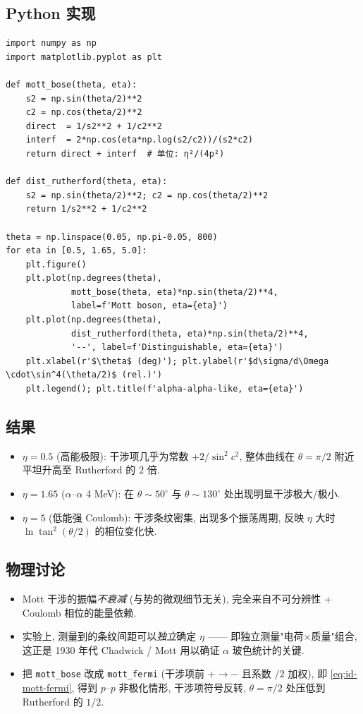 \subsection*{Python 实现}
\begin{lstlisting}
import numpy as np
import matplotlib.pyplot as plt

def mott_bose(theta, eta):
    s2 = np.sin(theta/2)**2
    c2 = np.cos(theta/2)**2
    direct  = 1/s2**2 + 1/c2**2
    interf  = 2*np.cos(eta*np.log(s2/c2))/(s2*c2)
    return direct + interf  # 单位: η²/(4p²)

def dist_rutherford(theta, eta):
    s2 = np.sin(theta/2)**2; c2 = np.cos(theta/2)**2
    return 1/s2**2 + 1/c2**2

theta = np.linspace(0.05, np.pi-0.05, 800)
for eta in [0.5, 1.65, 5.0]:
    plt.figure()
    plt.plot(np.degrees(theta),
             mott_bose(theta, eta)*np.sin(theta/2)**4,
             label=f'Mott boson, eta={eta}')
    plt.plot(np.degrees(theta),
             dist_rutherford(theta, eta)*np.sin(theta/2)**4,
             '--', label=f'Distinguishable, eta={eta}')
    plt.xlabel(r'$\theta$ (deg)'); plt.ylabel(r'$d\sigma/d\Omega \cdot\sin^4(\theta/2)$ (rel.)')
    plt.legend(); plt.title(f'alpha-alpha-like, eta={eta}')
\end{lstlisting}

\subsection*{结果}
\begin{itemize}
  \item $\eta=0.5$ (高能极限): 干涉项几乎为常数 $+2/\sin^2 c^2$, 整体曲线在 $\theta=\pi/2$ 附近平坦升高至 Rutherford 的 $2$ 倍.
  \item $\eta=1.65$ ($\alpha$--$\alpha$ 4 MeV): 在 $\theta\sim 50^\circ$ 与 $\theta\sim 130^\circ$ 处出现明显干涉极大/极小.
  \item $\eta=5$ (低能强 Coulomb): 干涉条纹密集, 出现多个振荡周期, 反映 $\eta$ 大时 $\ln\tan^2(\theta/2)$ 的相位变化快.
\end{itemize}

\subsection*{物理讨论}
\begin{itemize}
  \item Mott 干涉的振幅\emph{不衰减} (与势的微观细节无关), 完全来自不可分辨性 + Coulomb 相位的能量依赖.
  \item 实验上, 测量到的条纹间距可以\emph{独立}确定 $\eta$ —— 即独立测量"电荷$\times$质量"组合, 这正是 1930 年代 Chadwick / Mott 用以确证 $\alpha$ 玻色统计的关键.
  \item 把 \texttt{mott\_bose} 改成 \texttt{mott\_fermi} (干涉项前 $+\to -$ 且系数 $/2$ 加权), 即 \eqref{eq:id-mott-fermi}, 得到 $p$--$p$ 非极化情形, 干涉项符号反转, $\theta=\pi/2$ 处压低到 Rutherford 的 $1/2$.
\end{itemize}

